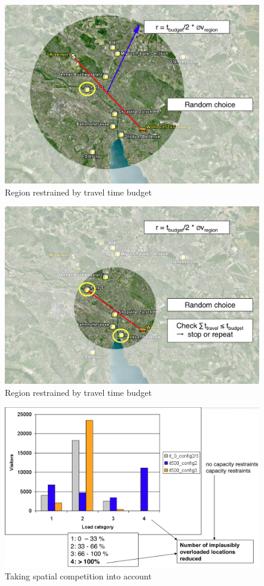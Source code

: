 \begin{figure}[htp]
\includegraphics[width=.9\textwidth]{figures/locationChoice/locachoice1.png}
\caption{Region restrained by travel time budget}
\label{fig:locachoice:1}
\end{figure}

\begin{figure}[htp]
\includegraphics[width=.9\textwidth]{figures/locationChoice/locachoice2.png}
\caption{Region restrained by travel time budget}
\label{fig:locachoice:2}
\end{figure}

\begin{figure}[htp]
\includegraphics[width=.9\textwidth]{figures/locationChoice/locachoice_capacities.png}
\caption{Taking spatial competition into account}
\label{fig:locachoice:3}
\end{figure}






